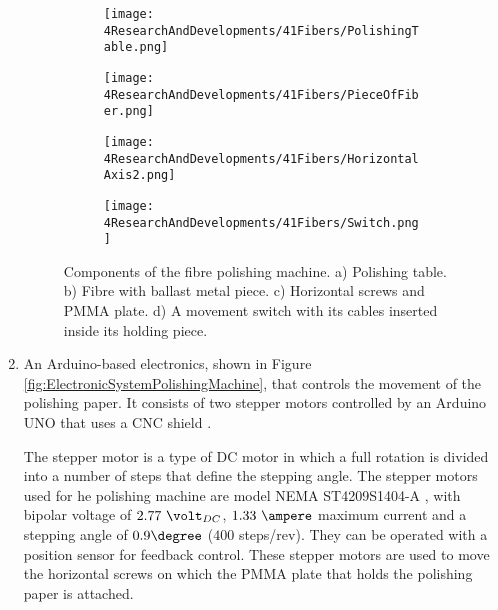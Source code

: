 \begin{enumerate}
\begin{figure}
\centering
    \begin{subfigure}[b]{0.55\textwidth}
    \centering
    \texttt{[image: 4ResearchAndDevelopments/41Fibers/PolishingTable.png]}  
    \caption{\label{subfig:PolishingTable}}
    \end{subfigure}
    \hfill
    \begin{subfigure}[b]{0.3\textwidth}
    \centering
    \texttt{[image: 4ResearchAndDevelopments/41Fibers/PieceOfFiber.png]}  
    \caption{\label{subfig:FiberMetailcPiece}}
    \end{subfigure}
    \hfill
    \begin{subfigure}[b]{0.55\textwidth}
    \centering
    \texttt{[image: 4ResearchAndDevelopments/41Fibers/HorizontalAxis2.png]}  
    \caption{\label{subfig:HorizontalAxis}}
    \end{subfigure}
    \hfill
    \begin{subfigure}[b]{0.4\textwidth}
    \centering
    \texttt{[image: 4ResearchAndDevelopments/41Fibers/Switch.png]}  
    \caption{\label{subfig:3DSwitchPiece}}
    \end{subfigure}
 \caption{Components of the fibre polishing machine. a) Polishing table. b) Fibre with ballast metal piece. c) Horizontal screws and PMMA plate. d) A movement switch with its cables inserted inside its holding piece.}
 \label{fig:PolishingTable}
\end{figure}

\item{} An Arduino-based electronics, shown in Figure \ref{fig:ElectronicSystemPolishingMachine}, that controls the movement of the polishing paper. It consists of two stepper motors controlled by an Arduino UNO \cite{ArduinoUNO} that uses a CNC shield \cite{CNCShield}.


The stepper motor is a type of DC motor in which a full rotation is divided into a number of steps that define the stepping angle. The stepper motors used for he polishing machine are model NEMA ST4209S1404-A \cite{StepperMotors}, with bipolar voltage of $2.77~\volt_{DC}$, $1.33~\ampere$ maximum current and a stepping angle of $0.9\degree$ ($400$ steps/rev). They can be operated with a position sensor for feedback control. These stepper motors are used to move the horizontal screws on which the PMMA plate that holds the polishing paper is attached.


\end{enumerate}
